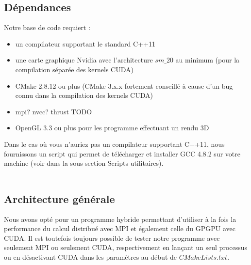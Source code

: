 \documentclass[12pt,a4paper,sans]{article}
\begin{document}
\subsection{Dépendances}
Notre base de code requiert :
\begin{itemize}
    \item un compilateur supportant le standard C++11
    \item une carte graphique Nvidia avec l'architecture $sm\_20$ au minimum (pour la compilation séparée des kernels CUDA)
    \item CMake 2.8.12 ou plus (CMake 3.x.x fortement conseillé à cause d'un bug connu dans la compilation des kernels CUDA)
    \item mpi? nvcc? thrust TODO 
    \item OpenGL 3.3 ou plus pour les programme effectuant un rendu 3D
\end{itemize}

Dans le cas où vous n'auriez pas un compilateur supportant C++11, nous fournissons un script qui permet de télécharger et installer GCC 4.8.2 sur votre machine (voir dans la sous-section Scripts utilitaires).\\\\

\subsection{Architecture générale}

Nous avons opté pour un programme hybride permettant d'utiliser à la fois la performance du calcul distribué avec MPI et également celle du GPGPU avec CUDA. Il est toutefois toujours possible de tester notre programme avec seulement MPI ou seulement CUDA, respectivement en lançant un seul processus ou en désactivant CUDA dans les paramètres au début de $CMakeLists.txt$.\\\\
\end{document}
